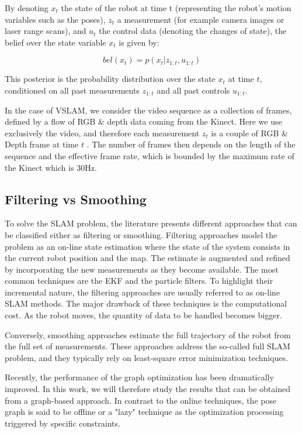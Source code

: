 By denoting $x_t$ the state of the robot at time t (representing the robot's motion variables such as the poses), $z_t$ a measurement (for example camera images or laser range scans), and $u_t$ the control data (denoting the changes of state), the belief over the state variable $x_t$ is given by:

\[bel(x_t) = p(x_t | z_{1:t}, u_{1:t})\]

This posterior is the probability distribution over the state $x_t$ at time $t$, conditioned on all past measurements $z_{1:t}$ and all past controls $u_{1:t}$.

In the case of \gls{VSLAM}, we consider the video sequence as a collection of frames, defined by a flow of RGB \& depth data coming from the Kinect. Here we use exclusively the video, and therefore each measurement $z_t$ is a couple of RGB \& Depth frame at time $t$ . The number of frames then depends on the length of the sequence and the effective frame rate, which is bounded by the maximum rate of the Kinect which is 30Hz.


\subsection{Filtering vs Smoothing}

To solve the \gls{SLAM} problem, the literature presents different approaches that can be classified either as filtering or smoothing. Filtering approaches model the problem as an on-line state estimation where the state of the system consists in the current robot position and the map. The estimate is augmented and refined by incorporating the new measurements as they become available.
The most common techniques are the \gls{EKF} and the particle filters. To highlight their incremental nature, the filtering approaches are usually referred to as on-line \gls{SLAM} methods.
The major drawback of these techniques is the computational cost. As the robot moves, the quantity of data to be handled becomes bigger.

Conversely, smoothing approaches estimate the full trajectory of the robot from the full set of measurements. These approaches address the so-called full \gls{SLAM} problem, and they typically rely on least-square error minimization techniques.

Recently, the performance of the graph optimization has been dramatically improved. In this work, we will therefore study the results that can be obtained from a graph-based approach. In contrast to the online techniques, the pose graph is said to be offline or a "lazy" technique as the optimization processing triggered by specific constraints.

